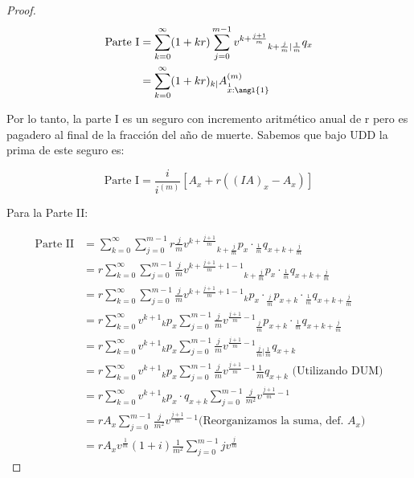 \begin{proof}
    \begin{align*}
        \text{Parte I} &= \sum_{k=0}^\infty (1 + kr) \sum_{j=0}^{m-1} v^{k+\frac{j+1}{m}} {}_{k+\frac{j}{m}|\frac{1}{m}} q_x \\
        &= \sum_{k=0}^\infty (1 + kr) {}_{k|}A^{(m)}_{\overset{1}{x}:\angl{1}}
    \end{align*}
    
    Por lo tanto, la parte I es un seguro con incremento aritmético anual de r pero es pagadero al final de la fracción del año de muerte. Sabemos que bajo UDD la prima de este seguro es:
    
    \begin{equation}
        \text{Parte I} = \frac{i}{i^{(m)}} [A_x + r((IA)_x - A_x)]
    \end{equation}
    
    Para la Parte II:

    \begin{align*}
        \text{Parte II} &= \sum_{k=0}^{\infty} \sum_{j=0}^{m-1} r\frac{j}{m} v^{k+\frac{j+1}{m}} {}_{k+\frac{j}{m}}p_x \cdot {}_{\frac{1}{m}}q_{x+k+\frac{j}{m}}\\
        &= r \sum_{k=0}^{\infty} \sum_{j=0}^{m-1} \frac{j}{m} v^{k+\frac{j+1}{m}+1-1} {}_{k+\frac{j}{m}}p_x \cdot {}_{\frac{1}{m}}q_{x+k+\frac{j}{m}}\\
        &= r \sum_{k=0}^{\infty} \sum_{j=0}^{m-1} \frac{j}{m} v^{k+\frac{j+1}{m}+1-1} {}_kp_x \cdot {}_{\frac{j}{m}}p_{x+k} \cdot {}_{\frac{1}{m}}q_{x+k+\frac{j}{m}}\\
        &= r \sum_{k=0}^{\infty} v^{k+1} {}_kp_x \sum_{j=0}^{m-1} \frac{j}{m} v^{\frac{j+1}{m}-1} {}_{\frac{j}{m}}p_{x+k} \cdot {}_{\frac{1}{m}}q_{x+k+\frac{j}{m}}\\
        &= r \sum_{k=0}^{\infty} v^{k+1} {}_kp_x \sum_{j=0}^{m-1} \frac{j}{m} v^{\frac{j+1}{m}-1} {}_{\frac{j}{m}|\frac{1}{m}}q_{x+k}\\
        &= r \sum_{k=0}^{\infty} v^{k+1} {}_kp_x \sum_{j=0}^{m-1} \frac{j}{m} v^{\frac{j+1}{m}-1} \frac{1}{m}q_{x+k} \text{ (Utilizando DUM)}\\
        &= r \sum_{k=0}^{\infty} v^{k+1} {}_kp_x \cdot q_{x+k} \sum_{j=0}^{m-1} \frac{j}{m^2} v^{\frac{j+1}{m}-1}\\
        &= r A_x \sum_{j=0}^{m-1} \frac{j}{m^2} v^{\frac{j+1}{m}-1} \text{(Reorganizamos la suma, def. $A_x$)}\\
        &= r A_x v^{\frac{1}{m}} (1 + i) \frac{1}{m^2} \sum_{j=0}^{m-1} j v^{\frac{j}{m}}
    \end{align*}


\end{proof}
